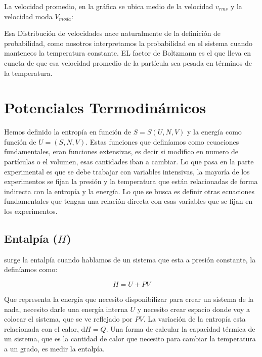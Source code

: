 \documentclass[11pt,fleqn]{book}
\begin{document}
La velocidad promedio, en la gráfica se ubica medio de la velocidad $v_{rms}$ y la velocidad moda $V_{moda}$:


Esa Distribución de velocidades nace naturalmente de la definición de probabilidad, como nosotros interpretamos la probabilidad en el sistema cuando manteneos la temperatura constante. EL factor de  Boltzmann es el que lleva en cuneta de que esa velocidad promedio de la partícula sea pesada en términos de la temperatura. 

\section{Potenciales Termodinámicos}

Hemos definido la entropía en función de $S=S(U, N, V)$ y la energía como función de $U=(S, N, V)$. Estas funciones que definíamos como ecuaciones fundamentales, eran funciones extensivas, es decir si modifico en numero de partículas o el volumen, esas cantidades iban a cambiar. Lo que pasa en la parte experimental es que se debe trabajar con variables intensivas, la mayoría de los experimentos se fijan la presión y  la temperatura que están relacionadas de forma indirecta con la entropía y la energía. Lo que se busca es definir otras ecuaciones fundamentales que tengan una relación directa con esas variables que se fijan en los experimentos.

\subsection{Entalpía ($H$)}

surge la entalpía cuando hablamos de un sistema que esta a presión constante, la definíamos como:

\begin{equation}
        H=U+PV
    \label{Eq. 4.53}
\end{equation}

Que representa la energía que necesito disponibilizar para crear un sistema de la nada, necesito darle una energía interna $U$ y necesito crear espacio donde voy a colocar el sistema, que se ve reflejado por $PV$. La variación de la entropía esta relacionada con el calor, $\mathrm{d}H=Q$. Una forma de calcular la capacidad térmica de un sistema, que es la cantidad de calor que necesito para cambiar la temperatura a un grado, es medir la entalpía. \\
\end{document}

